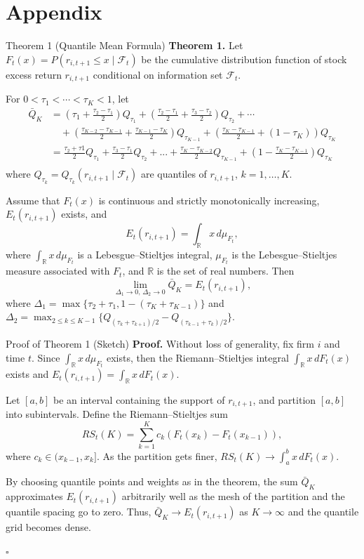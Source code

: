 \documentclass[aspectratio=169]{beamer}
\begin{document}
\section{Appendix}
\begin{frame}[allowframebreaks]{Theorem 1 (Quantile Mean Formula)}
\textbf{Theorem 1.} Let $F_t(x) = P(r_{i,t+1} \leq x \mid \mathcal{F}_t)$ be the cumulative distribution function of stock excess return $r_{i,t+1}$ conditional on information set $\mathcal{F}_t$.

For $0 < \tau_1 < \cdots < \tau_K < 1$, let
\[
\begin{aligned}
\bar{Q}_K &= (\tau_1 + \frac{\tau_2 - \tau_1}{2}) Q_{\tau_1} + (\frac{\tau_2 - \tau_1}{2} + \frac{\tau_3 - \tau_2}{2}) Q_{\tau_2} + \cdots \\
&\quad + (\frac{\tau_{K-2} - \tau_{K-1}}{2} + \frac{\tau_{K-1} - \tau_K}{2}) Q_{\tau_{K-1}} + (\frac{\tau_{K} - \tau_{K-1}}{2} + (1-\tau_K)) Q_{\tau_K} \\
&= \frac{\tau_2 + \tau 1}{2}Q_{\tau_1} + \frac{\tau_3 - \tau_1}{2} Q_{\tau_2} + ... + \frac{\tau_K - \tau_{K-2}}{2} Q_{\tau_{K-1}} + (1 - \frac{\tau_{K} - \tau_{K-1}}{2}) Q_{\tau_K} \\
\end{aligned}
\]
where $Q_{\tau_k} = Q_{\tau_k}(r_{i,t+1} \mid \mathcal{F}_t)$ are quantiles of $r_{i,t+1}$, $k = 1, \ldots, K$.

Assume that $F_t(x)$ is continuous and strictly monotonically increasing, $E_t(r_{i,t+1})$ exists, and
\[
E_t(r_{i,t+1}) = \int_{\mathbb{R}} x\, d\mu_{F_t},
\]
where $\int_{\mathbb{R}} x\, d\mu_{F_t}$ is a Lebesgue–Stieltjes integral, $\mu_{F_t}$ is the Lebesgue–Stieltjes measure associated with $F_t$, and $\mathbb{R}$ is the set of real numbers. Then
\[
\lim_{\Delta_1 \to 0,\, \Delta_2 \to 0} \bar{Q}_K = E_t(r_{i,t+1}),
\]
where $\Delta_1 = \max\{\tau_2 + \tau_1, 1 - (\tau_K + \tau_{K-1})\}$ and $\Delta_2 = \max_{2 \leq k \leq K-1} \{ Q_{(\tau_k + \tau_{k+1})/2} - Q_{(\tau_{k-1} + \tau_k)/2} \}$.
\end{frame}

\begin{frame}{Proof of Theorem 1 (Sketch)}
\textbf{Proof.} Without loss of generality, fix firm $i$ and time $t$. Since $\int_{\mathbb{R}} x\, d\mu_{F_t}$ exists, then the Riemann–Stieltjes integral $\int_{\mathbb{R}} x\, dF_t(x)$ exists and $E_t(r_{i,t+1}) = \int_{\mathbb{R}} x\, dF_t(x)$.

Let $[a, b]$ be an interval containing the support of $r_{i,t+1}$, and partition $[a, b]$ into subintervals. Define the Riemann–Stieltjes sum
\[
RS_t(K) = \sum_{k=1}^K c_k (F_t(x_k) - F_t(x_{k-1})),
\]
where $c_k \in (x_{k-1}, x_k]$. As the partition gets finer, $RS_t(K) \to \int_a^b x\, dF_t(x)$.

By choosing quantile points and weights as in the theorem, the sum $\bar{Q}_K$ approximates $E_t(r_{i,t+1})$ arbitrarily well as the mesh of the partition and the quantile spacing go to zero. Thus, $\bar{Q}_K \to E_t(r_{i,t+1})$ as $K \to \infty$ and the quantile grid becomes dense.

\hfill$\square$
\end{frame}
\end{document}
